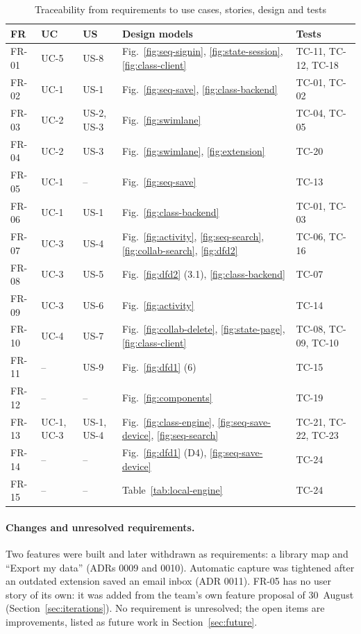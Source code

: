 \begin{table}[H]
\centering
\footnotesize
\begin{tabularx}{\textwidth}{>{\ttfamily}p{} >{\ttfamily}p{} >{\ttfamily}p{} L >{\ttfamily}p{0.16\textwidth}}
\toprule
\textrm{\textbf{FR}} & \textrm{\textbf{UC}} & \textrm{\textbf{US}} & \textbf{Design models} & \textrm{\textbf{Tests}} \\
\midrule
FR-01 & UC-5 & US-8 & Fig.~\ref{fig:seq-signin}, \ref{fig:state-session}, \ref{fig:class-client} & TC-11, TC-12, TC-18 \\
FR-02 & UC-1 & US-1 & Fig.~\ref{fig:seq-save}, \ref{fig:class-backend} & TC-01, TC-02 \\
FR-03 & UC-2 & US-2, US-3 & Fig.~\ref{fig:swimlane} & TC-04, TC-05 \\
FR-04 & UC-2 & US-3 & Fig.~\ref{fig:swimlane}, \ref{fig:extension} & TC-20 \\
FR-05 & UC-1 & -- & Fig.~\ref{fig:seq-save} & TC-13 \\
FR-06 & UC-1 & US-1 & Fig.~\ref{fig:class-backend} & TC-01, TC-03 \\
FR-07 & UC-3 & US-4 & Fig.~\ref{fig:activity}, \ref{fig:seq-search}, \ref{fig:collab-search}, \ref{fig:dfd2} & TC-06, TC-16 \\
FR-08 & UC-3 & US-5 & Fig.~\ref{fig:dfd2} (3.1), \ref{fig:class-backend} & TC-07 \\
FR-09 & UC-3 & US-6 & Fig.~\ref{fig:activity} & TC-14 \\
FR-10 & UC-4 & US-7 & Fig.~\ref{fig:collab-delete}, \ref{fig:state-page}, \ref{fig:class-client} & TC-08, TC-09, TC-10 \\
FR-11 & -- & US-9 & Fig.~\ref{fig:dfd1} (6) & TC-15 \\
FR-12 & -- & -- & Fig.~\ref{fig:components} & TC-19 \\
FR-13 & UC-1, UC-3 & US-1, US-4 & Fig.~\ref{fig:class-engine}, \ref{fig:seq-save-device}, \ref{fig:seq-search} & TC-21, TC-22, TC-23 \\
FR-14 & -- & -- & Fig.~\ref{fig:dfd1} (D4), \ref{fig:seq-save-device} & TC-24 \\
FR-15 & -- & -- & Table~\ref{tab:local-engine} & TC-24 \\
\bottomrule
\end{tabularx}
\caption{Traceability from requirements to use cases, stories, design and tests}
\label{tab:trace}
\end{table}

\paragraph{Changes and unresolved requirements.} Two features were built and
later withdrawn as requirements: a library map and ``Export my data''
(ADRs 0009 and 0010). Automatic capture was tightened after an outdated
extension saved an email inbox (ADR 0011). FR-05 has no user story of its own:
it was added from the team's own feature proposal of 30~August
(Section~\ref{sec:iterations}). No
requirement is unresolved; the open items are improvements, listed as future
work in Section~\ref{sec:future}.
